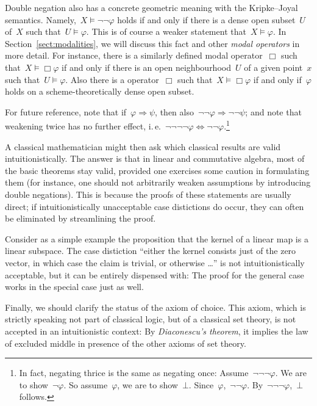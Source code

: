 \documentclass[10pt]{amsart}
\makeatletter
\theoremstyle{definition}
\theoremstyle{plain}
\theoremstyle{remark}
\newcommand{\?}{\,{:}\,}
\renewcommand{\_}{\mathpunct{.}\,}
\newcommand{\ie}{i.\,e.\@\xspace}
\makeatother
\begin{document}
Double negation also has a concrete geometric meaning with the
Kripke--Joyal semantics. Namely,~$X \models \neg\neg\varphi$ holds if and
only if there is a dense open subset~$U$ of~$X$ such that~$U \models \varphi$.
This is of course a weaker statement that~$X \models \varphi$.
In Section~\ref{sect:modalities}, we will discuss this fact and other
\emph{modal operators} in more detail. For instance, there is a similarly defined modal
operator~$\Box$ such that~$X \models \Box\varphi$ if and only if there is an
open neighbourhood~$U$ of a given point~$x$ such that~$U \models \varphi$. Also
there is a operator~$\Box$ such that~$X \models \Box\varphi$ if and only
if~$\varphi$ holds on a scheme-theoretically dense open subset.

For future reference, note that if~$\varphi \Rightarrow \psi$,
then also~$\neg\neg\varphi \Rightarrow \neg\neg\psi$; and note that weakening
twice has no further effect, \ie~$\neg\neg\neg\neg\varphi \Leftrightarrow
\neg\neg\varphi$.\footnote{In fact, negating thrice is the same as negating
once: Assume~$\neg\neg\neg\varphi$. We are to show~$\neg\varphi$. So
assume~$\varphi$, we are to show~$\bot$. Since~$\varphi$,~$\neg\neg\varphi$.
By~$\neg\neg\neg\varphi$,~$\bot$ follows.}

A classical mathematician might then ask which classical results are valid
intuitionistically. The answer is that in linear and commutative algebra, most
of the basic theorems stay valid, provided one exercises some caution in
formulating them (for instance, one should not arbitrarily weaken assumptions
by introducing double negations). This is because the proofs of these
statements are usually direct; if intuitionistically unacceptable case
distictions do occur, they can often be eliminated by streamlining the proof.

Consider as a simple example the proposition that the kernel of a linear map is
a linear subspace. The case distiction ``either the kernel consists just of the
zero vector, in which case the claim is trivial, or otherwise \ldots'' is not
intuitionistically acceptable, but it can be entirely dispensed with: The proof
for the general case works in the special case just as well.

Finally, we should clarify the status of the axiom of choice. This axiom, which
is strictly speaking not part of classical logic, but of a classical set
theory, is not accepted in an intuitionistic context: By \emph{Diaconescu's
theorem}, it implies the law of excluded middle in presence of the other axioms
of set theory.
\end{document}
